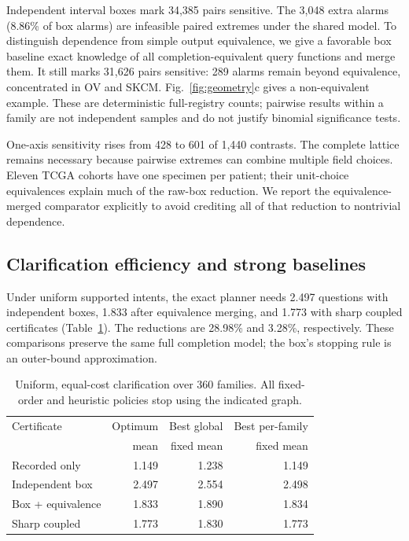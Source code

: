 Independent interval boxes mark 34,385 pairs sensitive. The 3,048 extra alarms (8.86\% of box alarms) are infeasible paired extremes under the shared model. To distinguish dependence from simple output equivalence, we give a favorable box baseline exact knowledge of all completion-equivalent query functions and merge them. It still marks 31,626 pairs sensitive: 289 alarms remain beyond equivalence, concentrated in OV and SKCM. Fig.~\ref{fig:geometry}c gives a non-equivalent example. These are deterministic full-registry counts; pairwise results within a family are not independent samples and do not justify binomial significance tests.

One-axis sensitivity rises from 428 to 601 of 1,440 contrasts. The complete lattice remains necessary because pairwise extremes can combine multiple field choices. Eleven TCGA cohorts have one specimen per patient; their unit-choice equivalences explain much of the raw-box reduction. We report the equivalence-merged comparator explicitly to avoid crediting all of that reduction to nontrivial dependence.

\subsection{Clarification efficiency and strong baselines}
Under uniform supported intents, the exact planner needs 2.497 questions with independent boxes, 1.833 after equivalence merging, and 1.773 with sharp coupled certificates (Table~\ref{tab:planning}). The reductions are 28.98\% and 3.28\%, respectively. These comparisons preserve the same full completion model; the box's stopping rule is an outer-bound approximation.

\begin{table}[t]
\caption{Uniform, equal-cost clarification over 360 families. All fixed-order and heuristic policies stop using the indicated graph.}
\label{tab:planning}
\centering
\begin{tabular}{lrrr}
\toprule
Certificate & Optimum & Best global & Best per-family\\
 & mean & fixed mean & fixed mean\\
\midrule
Recorded only & 1.149 & 1.238 & 1.149\\
Independent box & 2.497 & 2.554 & 2.498\\
Box + equivalence & 1.833 & 1.890 & 1.834\\
Sharp coupled & 1.773 & 1.830 & 1.773\\
\bottomrule
\end{tabular}
\end{table}


